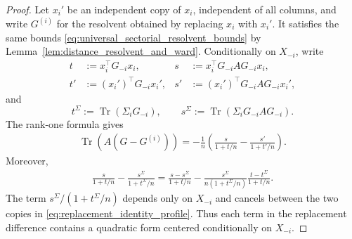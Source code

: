 \documentclass[EJP, preprint, NODS, nobera, nofontexpansion]{ejpecp}
\DeclareMathOperator{\tr}{Tr}
\begin{document}
\begin{proof}
    Let $x_i'$ be an independent copy of $x_i$, independent of all columns,
and write $G^{(i)}$ for the resolvent obtained by replacing $x_i$ with
$x_i'$. It satisfies the same bounds
\eqref{eq:universal_sectorial_resolvent_bounds} by
Lemma~\ref{lem:distance_resolvent_and_ward}.
Conditionally on $X_{-i}$, write
\begin{align*}
    t&:=x_i^{\top}G_{-i}x_i,
    &s&:=x_i^{\top}G_{-i}AG_{-i}x_i,\\
    t'&:=(x_i')^\top G_{-i}x_i',
    &s'&:=(x_i')^\top G_{-i}AG_{-i}x_i',
\end{align*}
and
\[
    t^\Sigma:=\tr(\Sigma_iG_{-i}),
    \qquad
    s^\Sigma:=\tr(\Sigma_iG_{-i}AG_{-i}).
\]
The rank-one formula gives
\begin{align}\label{eq:replacement_identity_profile}
    \tr\left(A(G-G^{(i)})\right)
    =
    -\frac1n\left(
        \frac{s}{1+t/n}
        -
        \frac{s'}{1+t'/n}
    \right).
\end{align}
Moreover,
\begin{align}\label{eq:self_normalized_decomposition_profile}
    \frac{s}{1+t/n}
    -
    \frac{s^\Sigma}{1+t^\Sigma/n}
    =
    \frac{s-s^\Sigma}{1+t/n}
    -
    \frac{s^\Sigma}{n(1+t^\Sigma/n)}
    \frac{t-t^\Sigma}{1+t/n}.
\end{align}
The term $s^\Sigma/(1+t^\Sigma/n)$ depends only on $X_{-i}$ and
cancels between the two copies in \eqref{eq:replacement_identity_profile}.
Thus each term in the replacement difference contains a quadratic
form centered conditionally on \(X_{-i}\).


\end{proof}
\end{document}
